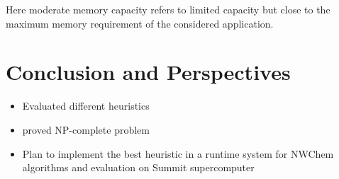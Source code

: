 \documentclass[runningheads]{llncs} %
\begin{document}
Here moderate memory capacity refers to limited capacity but close to the maximum memory  requirement of the considered application.

\newpage
	\section{Conclusion and Perspectives}
	\begin{itemize}
		\item Evaluated different heuristics
		\item proved NP-complete problem
		\item Plan to implement the best heuristic in a runtime system  for NWChem algorithms and evaluation on Summit supercomputer
	\end{itemize}
\end{document}
